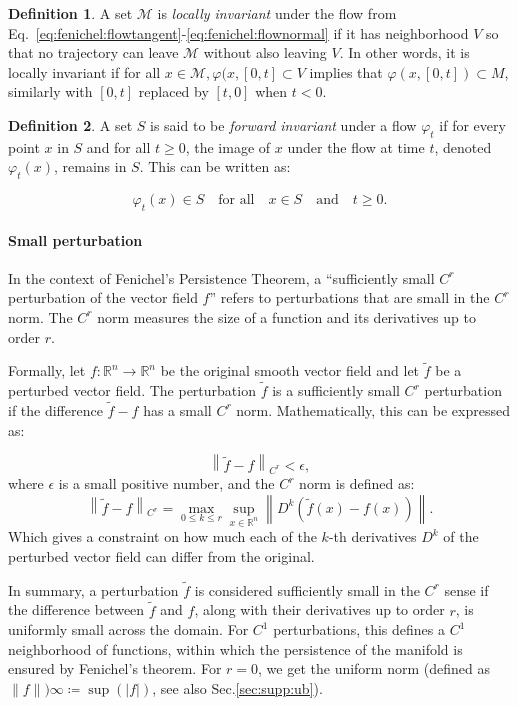 \documentclass{article} %
\newcounter{ct}
\newcommand{\manifold}{\mathcal{M}}
\theoremstyle{definition}
\newtheorem{definition}{Definition}
\theoremstyle{remark}
\begin{document}
\begin{definition}
A set \(\manifold\) is \emph{locally invariant} under the flow from Eq.~\ref{eq:fenichel:flowtangent}-\ref{eq:fenichel:flownormal} if it has neighborhood \(V\) so that no trajectory can leave \(\manifold\) without also leaving \(V\).
In other words, it is locally invariant if for all \(x \in \manifold, \varphi(x, [0, t] \subset V\) implies that  \(\varphi(x,[0, t]) \subset M\), similarly with \([0, t]\) replaced by \([t, 0]\) when \(t < 0\).
\end{definition}

\begin{definition}
A set \( S \) is said to be \emph{forward invariant} under a flow \( \varphi_{t} \) if for every point \( x \) in \( S \) and for all \( t \geq 0 \), the image of \( x \) under the flow at time \( t \), denoted \( \varphi_{t}(x) \), remains in \( S \). This can be written as:

\[ \varphi_{t}(x) \in S \quad \text{for all} \quad x \in S \quad \text{and} \quad t \geq 0. \]
\end{definition}

\paragraph{Small perturbation}
In the context of Fenichel's Persistence Theorem, a ``sufficiently small \( C^{r} \) perturbation of the vector field \( f \)'' refers to perturbations that are small in the \( C^{r} \) norm. The \( C^{r} \) norm measures the size of a function and its derivatives up to order \( r \).

Formally, let \( f: \mathbb{R}^{n} \rightarrow \mathbb{R}^{n} \) be the original smooth vector field and let \( \tilde{f} \) be a perturbed vector field. The perturbation \( \tilde{f} \) is a sufficiently small \( C^{r} \) perturbation if the difference \( \tilde{f} - f \) has a small \( C^{r} \) norm. Mathematically, this can be expressed as:

\[ \left\| \tilde{f} - f \right\|_{C^{r}} < \epsilon, \]
where \( \epsilon \) is a small positive number, and the \( C^{r} \) norm is defined as:
\[ \left\| \tilde{f} - f \right\|_{C^{r}} = \max_{0 \leq k \leq r} \sup_{x \in \mathbb{R}^{n}} \left\| D^{k} (\tilde{f}(x) - f(x)) \right\|. \]
Which gives a constraint on how much each of the \(k\)-th derivatives \( D^{k} \) of the perturbed vector field can differ from the original.

In summary, a perturbation \( \tilde{f} \) is considered sufficiently small in the \( C^{r} \) sense if the difference between \( \tilde{f} \) and \( f \), along with their derivatives up to order \( r \), is uniformly small across the domain.
For \(C^{1}\) perturbations, this defines a \(C^{1}\)  neighborhood of functions, within which the persistence of the manifold is ensured by Fenichel's theorem.
For $r=0$, we get the uniform norm (defined as \(\|f\|)\infty\coloneqq \sup(|f|)\), see also Sec.\ref{sec:supp:ub}).
\end{document}
